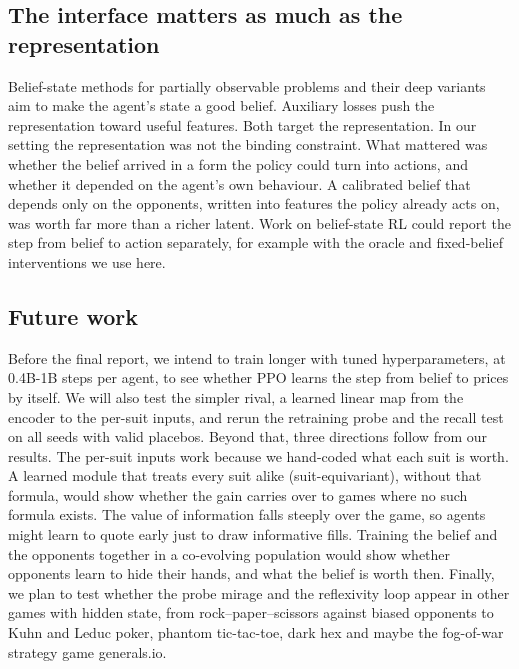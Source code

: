 \documentclass{article}
\begin{document}
\subsection{The interface matters as much as the representation}
Belief-state methods for partially observable problems \cite{kaelbling1998pomdp} and their deep variants \cite{hausknecht2015drqn,igl2018dvrl} aim to make the agent's state a good belief. Auxiliary losses \cite{jaderberg2017unreal} push the representation toward useful features. Both target the representation. In our setting the representation was not the binding constraint. What mattered was whether the belief arrived in a form the policy could turn into actions, and whether it depended on the agent's own behaviour. A calibrated belief that depends only on the opponents, written into features the policy already acts on, was worth far more than a richer latent. Work on belief-state RL could report the step from belief to action separately, for example with the oracle and fixed-belief interventions we use here.

\subsection{Future work}
Before the final report, we intend to train longer with tuned hyperparameters, at 0.4B-1B steps per agent, to see whether PPO learns the step from belief to prices by itself. We will also test the simpler rival, a learned linear map from the encoder to the per-suit inputs, and rerun the retraining probe and the recall test on all seeds with valid placebos. Beyond that, three directions follow from our results. The per-suit inputs work because we hand-coded what each suit is worth. A learned module that treats every suit alike (suit-equivariant), without that formula, would show whether the gain carries over to games where no such formula exists. The value of information falls steeply over the game, so agents might learn to quote early just to draw informative fills. Training the belief and the opponents together in a co-evolving population would show whether opponents learn to hide their hands, and what the belief is worth then. Finally, we plan to test whether the probe mirage and the reflexivity loop appear in other games with hidden state, from rock--paper--scissors against biased opponents to Kuhn and Leduc poker, phantom tic-tac-toe, dark hex and maybe the fog-of-war strategy game generals.io.
\end{document}
